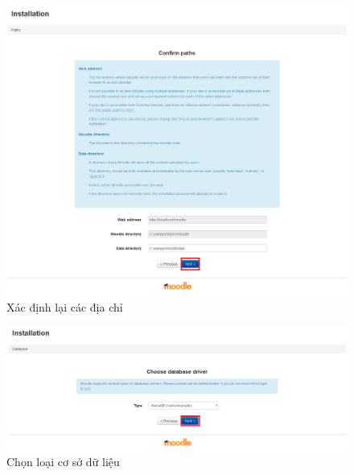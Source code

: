 \begin{center}
	\begin{figure}[htp]
		\begin{center}
			\includegraphics[width=0.8\linewidth]{img/direct}
		\end{center}
		\caption{Xác định lại các địa chỉ}
		\label{refhinh31}
	\end{figure}
\end{center}

\begin{center}
	\begin{figure}[htp]
		\begin{center}
			\includegraphics[width=1\linewidth]{img/2}
		\end{center}
		\caption{Chọn loại cơ sở dữ liệu}
		\label{refhinh32}
	\end{figure}
\end{center}

